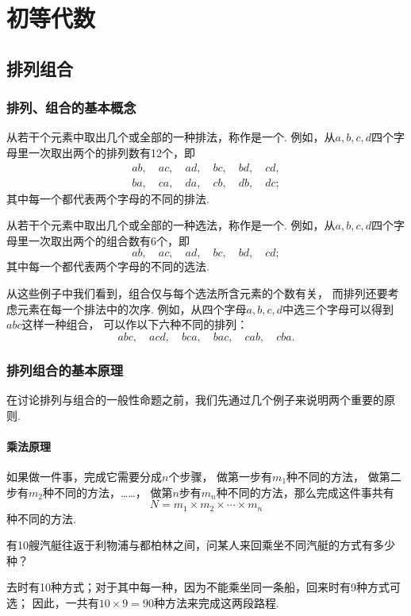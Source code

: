 \chapter{初等代数}
\section{排列组合}
\subsection{排列、组合的基本概念}
从若干个元素中取出几个或全部的一种排法，称作是一个.
例如，从\(a,b,c,d\)四个字母里一次取出两个的排列数有12个，即\[
	\begin{gathered}
	ab, \quad
	ac, \quad
	ad, \quad
	bc, \quad
	bd, \quad
	cd, \\
	ba, \quad
	ca, \quad
	da, \quad
	cb, \quad
	db, \quad
	dc;
	\end{gathered}
\]
其中每一个都代表两个字母的不同的排法.

从若干个元素中取出几个或全部的一种选法，称作是一个.
例如，从\(a,b,c,d\)四个字母里一次取出两个的组合数有6个，即\[
	ab, \quad
	ac, \quad
	ad, \quad
	bc, \quad
	bd, \quad
	cd;
\]
其中每一个都代表两个字母的不同的选法.

从这些例子中我们看到，组合仅与每个选法所含元素的个数有关，
而排列还要考虑元素在每一个排法中的次序.
例如，从四个字母\(a,b,c,d\)中选三个字母可以得到\(abc\)这样一种组合，
可以作以下六种不同的排列：\[
	abc, \quad
	acd, \quad
	bca, \quad
	bac, \quad
	cab, \quad
	cba.
\]

\subsection{排列组合的基本原理}
在讨论排列与组合的一般性命题之前，我们先通过几个例子来说明两个重要的原则.

\subsubsection{乘法原理}
如果做一件事，完成它需要分成\(n\)个步骤，
做第一步有\(m_1\)种不同的方法，
做第二步有\(m_2\)种不同的方法，……，
做第\(n\)步有\(m_n\)种不同的方法，那么完成这件事共有\[
N = m_1 \times m_2 \times \dotsm \times m_n
\]种不同的方法.

\begin{example}
有10艘汽艇往返于利物浦与都柏林之间，问某人来回乘坐不同汽艇的方式有多少种？
\begin{solution}
去时有10种方式；对于其中每一种，因为不能乘坐同一条船，回来时有9种方式可选；
因此，一共有\(10 \times 9 = 90\)种方法来完成这两段路程.
\end{solution}
\end{example}

